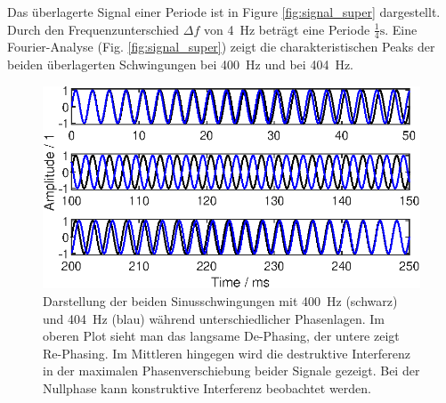 Das überlagerte Signal einer Periode ist in Figure \ref{fig:signal_super}\protect{} dargestellt. Durch den Frequenzunterschied $\Delta f$ von \SI{4}{\Hz} beträgt eine Periode $\frac{1}{4}\si{\s}$. Eine Fourier-Analyse (Fig. 
\ref{fig:signal_super}\protect{}) zeigt die charakteristischen Peaks der beiden überlagerten Schwingungen bei \SI{400}{\Hz} und bei \SI{404}{\Hz}.

\begin{figure}[h] 
  \centering
  \includegraphics[width=\linewidth]{ue4/signal_beat.eps} %
  \caption{Darstellung der beiden Sinusschwingungen mit \SI{400}{\Hz} (schwarz) und \SI{404}{\Hz} (blau) während unterschiedlicher Phasenlagen. Im oberen Plot sieht man das langsame De-Phasing, der untere zeigt Re-Phasing. Im Mittleren hingegen wird die destruktive Interferenz in der maximalen Phasenverschiebung beider Signale gezeigt. Bei der Nullphase kann konstruktive Interferenz beobachtet werden.}
  \label{fig:signal}
\end{figure}

